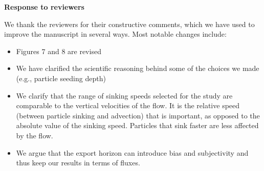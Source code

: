 \documentclass[12pt,letter]{article}
\begin{document}
\begin{center}
\large
\textbf{
Response to reviewers\\}
\end{center}
\small



We thank the reviewers for their constructive comments, which we have used to improve the manuscript in several ways. Most notable changes include:
\begin{itemize}
    \item Figures 7 and 8 are revised
    \item We have clarified the scientific reasoning behind some of the choices we made (e.g., particle seeding depth)
    \item We clarify that the range of sinking speeds selected for the study are comparable to the vertical velocities of the flow. It is the relative speed (between particle sinking and advection) that is important, as opposed to the absolute value of the sinking speed. Particles that sink faster are less affected by the flow.
    \item We argue that the export horizon can introduce bias and subjectivity \citep{Palevsky_2018, buesseler2020metrics} and thus keep our results in terms of fluxes.
\end{itemize}

\end{document}
